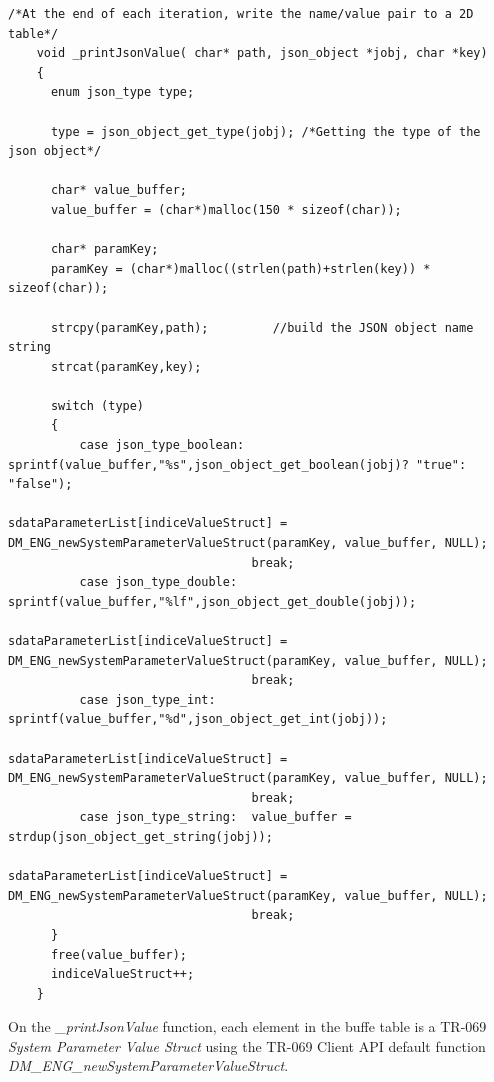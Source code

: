 \begin{lstlisting}[mathescape]
    /*At the end of each iteration, write the name/value pair to a 2D table*/
    void _printJsonValue( char* path, json_object *jobj, char *key)
    {
      enum json_type type;

      type = json_object_get_type(jobj); /*Getting the type of the json object*/

      char* value_buffer;
      value_buffer = (char*)malloc(150 * sizeof(char));

      char* paramKey;
      paramKey = (char*)malloc((strlen(path)+strlen(key)) * sizeof(char));

      strcpy(paramKey,path);         //build the JSON object name string
      strcat(paramKey,key);

      switch (type)
      {
          case json_type_boolean: sprintf(value_buffer,"%s",json_object_get_boolean(jobj)? "true": "false");
                                  sdataParameterList[indiceValueStruct] = DM_ENG_newSystemParameterValueStruct(paramKey, value_buffer, NULL);
                                  break;
          case json_type_double:  sprintf(value_buffer,"%lf",json_object_get_double(jobj));
                                  sdataParameterList[indiceValueStruct] = DM_ENG_newSystemParameterValueStruct(paramKey, value_buffer, NULL);
                                  break;
          case json_type_int:     sprintf(value_buffer,"%d",json_object_get_int(jobj));
                                  sdataParameterList[indiceValueStruct] = DM_ENG_newSystemParameterValueStruct(paramKey, value_buffer, NULL);
                                  break;
          case json_type_string:  value_buffer = strdup(json_object_get_string(jobj));
                                  sdataParameterList[indiceValueStruct] = DM_ENG_newSystemParameterValueStruct(paramKey, value_buffer, NULL);
                                  break;
      }
      free(value_buffer);
      indiceValueStruct++;
    }
\end{lstlisting}

On the \textit{\_printJsonValue} function, each element in the buffe table is a TR-069 \textit{System Parameter Value Struct} using the TR-069 Client API default function \textit{DM\_ENG\_newSystemParameterValueStruct}.
